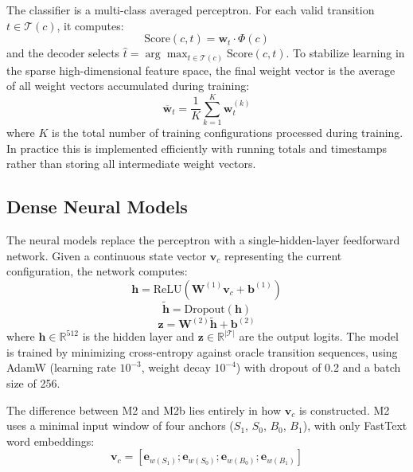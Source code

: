\documentclass[12pt,letterpaper]{article}
\begin{document}
The classifier is a multi-class averaged perceptron. For each valid 
transition $t \in \mathcal{T}(c)$, it computes:
\begin{equation}
    \text{Score}(c, t) = \mathbf{w}_t \cdot \Phi(c)
\end{equation}
and the decoder selects $\hat{t} = \arg\max_{t \in \mathcal{T}(c)} 
\text{Score}(c, t)$. To stabilize learning in the sparse high-dimensional 
feature space, the final weight vector is the average of all weight vectors 
accumulated during training:
\begin{equation}
    \overline{\mathbf{w}}_t = \frac{1}{K} \sum_{k=1}^{K} \mathbf{w}_t^{(k)}
\end{equation}
where $K$ is the total number of training configurations processed during 
training. In practice this is implemented efficiently with running totals and 
timestamps rather than storing all intermediate weight vectors.\subsection{Dense Neural Models}
\label{subsec:dense_models}

The neural models replace the perceptron with a single-hidden-layer feedforward network. Given a continuous state vector $\mathbf{v}_c$ representing the current configuration, the network computes:
\begin{equation}
\mathbf{h} = \text{ReLU}\left(\mathbf{W}^{(1)} \mathbf{v}_c + \mathbf{b}^{(1)}\right)
\end{equation}
\begin{equation}
\tilde{\mathbf{h}} = \text{Dropout}(\mathbf{h})
\end{equation}
\begin{equation}
\mathbf{z} = \mathbf{W}^{(2)} \tilde{\mathbf{h}} + \mathbf{b}^{(2)}
\end{equation}
where $\mathbf{h} \in \mathbb{R}^{512}$ is the hidden layer and $\mathbf{z} \in \mathbb{R}^{|\mathcal{T}|}$ are the output logits. The model is trained by minimizing cross-entropy against oracle transition sequences, using AdamW (learning rate $10^{-3}$, weight decay $10^{-4}$) with dropout of 0.2 and a batch size of 256.

The difference between M2 and M2b lies entirely in how $\mathbf{v}_c$ is constructed. M2 uses a minimal input window of four anchors ($S_1$, $S_0$, $B_0$, $B_1$), with only FastText word embeddings:
\begin{equation}
\mathbf{v}_c =
\left[
\mathbf{e}_{w(S_1)};
\mathbf{e}_{w(S_0)};
\mathbf{e}_{w(B_0)};
\mathbf{e}_{w(B_1)}
\right]
\end{equation}
\end{document}
